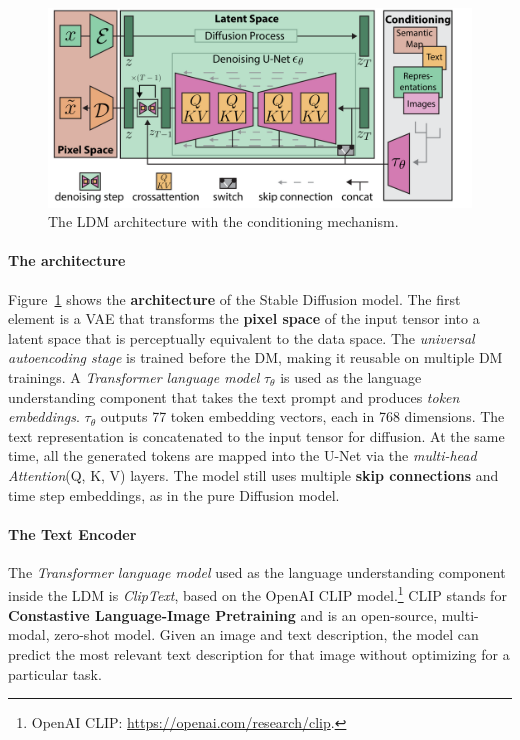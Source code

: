 \documentclass[sn-mathphys,Numbered]{sn-jnl}
\theoremstyle{thmstyleone}%
\theoremstyle{thmstyletwo}%
\theoremstyle{thmstylethree}%
\begin{document}
\begin{figure}[b]
	\centering
    \includegraphics[scale=0.9]{img/svg/SDArch.png}
	\caption{The LDM architecture with the conditioning mechanism.}\label{fig:ldm-architecture}
\end{figure}


\paragraph{The architecture}\label{sec:ldm-architecture} 




Figure~\ref{fig:ldm-architecture} shows the \textbf{architecture} of the Stable Diffusion model.
The first element is a VAE that transforms the \textbf{pixel space} of the input tensor into a latent space that is  perceptually equivalent to the data space. The \emph{universal autoencoding stage} is trained before the DM,  making it reusable on multiple DM trainings. A \emph{Transformer language model} $\tau_\theta$ is used as the language understanding component  that takes the text prompt and produces \emph{token embeddings}. $\tau_\theta$ outputs 77 token embedding vectors, each in 768 dimensions. 
The text representation is concatenated to the input tensor for diffusion. At the same time, all the generated tokens are mapped into the  U-Net via the \emph{multi-head Attention}(Q, K, V) layers. The model still uses multiple \textbf{skip connections} and time step embeddings,
as in the pure Diffusion model.



\paragraph{The Text Encoder}

The \emph{Transformer language model} used as the language understanding component inside the LDM is \emph{ClipText}, based on the OpenAI CLIP model.\footnote{OpenAI CLIP: \url{https://openai.com/research/clip}.}
CLIP stands for \textbf{Constastive Language-Image Pretraining} and is an open-source, multi-modal, zero-shot model. 
Given an image and text description, the model can predict the most relevant text description for that image without 
optimizing for a particular task.
\end{document}
